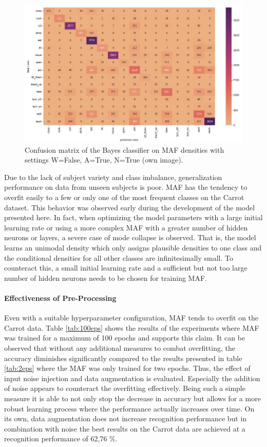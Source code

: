 \documentclass[11pt,titlepage,oneside,openany]{book}
\begin{document}
\begin{figure}[h]
	\centering
	\includegraphics[width=\linewidth]{conf_mat.jpg}
	\caption[Confusion Matrix MAF with Bayes classifier]{Confusion matrix of the Bayes classifier on MAF densities with settings W=False, A=True, N=True (own image).}
	\label{fig:conf}
\end{figure}

Due to the lack of subject variety and class imbalance, generalization performance on data from unseen subjects is poor. MAF has the tendency to overfit easily to a few or only one of the most frequent classes on the Carrot dataset. This behavior was observed early during the development of the model presented here. In fact, when optimizing the model parameters with a large initial learning rate or using a more complex MAF with a greater number of hidden neurons or layers, a severe case of mode collapse is observed. That is, the model learns an unimodal density which only assigns plausible densities to one class and the conditional densities for all other classes are infinitesimally small. To counteract this, a small initial learning rate and a sufficient but not too large number of hidden neurons needs to be chosen for training MAF.

\paragraph{Effectiveness of Pre-Processing}
Even with a suitable hyperparameter configuration, MAF tends to overfit on the Carrot data. Table \ref{tab:100eps} shows the results of the experiments where MAF was trained for a maximum of 100 epochs and supports this claim. It can be observed that without any additional measures to combat overfitting, the accuracy diminishes significantly compared to the results presented in table \ref{tab:2eps} where the MAF was only trained for two epochs. Thus, the effect of input noise injection and data augmentation is evaluated. Especially the addition of noise appears to counteract the overfitting effectively. Being such a simple measure it is able to not only stop the decrease in accuracy but allows for a more robust learning process where the performance actually increases over time. On its own, data augmentation does not increase recognition performance but in combination with noise the best results on the Carrot data are achieved at a recognition performance of 62,76 \%.
\end{document}
